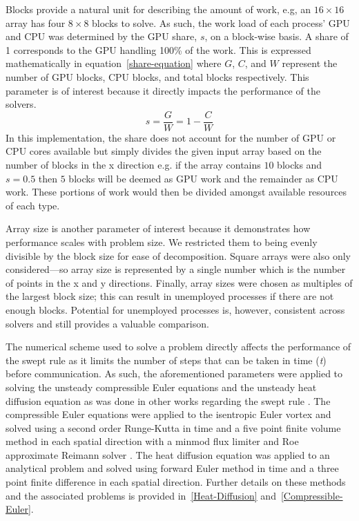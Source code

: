 \documentclass[preprints,article,accept,moreauthors,pdftex]{Definitions/mdpi}
\begin{document}
\par
Blocks provide a natural unit for describing the amount of work, e.g, an $16\times16$ array has four $8\times8$ blocks to solve. As such, the work load of each process' GPU and CPU was determined by the GPU share, $s$, on a block-wise basis. A share of 1 corresponds to the GPU handling 100\% of the work. This is expressed mathematically in equation~\ref{share-equation} where $G$, $C$, and $W$ represent the number of GPU blocks, CPU blocks, and total blocks respectively. This parameter is of interest because it directly impacts the performance of the solvers.
\begin{equation}
    \label{share-equation}
    s = \frac{G}{W} = 1-\frac{C}{W}
\end{equation}
In this implementation, the share does not account for the number of GPU or CPU cores available but simply divides the given input array based on the number of blocks in the x direction e.g. if the array contains $10$ blocks and $s=0.5$ then $5$ blocks will be deemed as GPU work and the remainder as CPU work. These portions of work would then be divided amongst available resources of each type. 

\par
Array size is another parameter of interest because it demonstrates how performance scales with problem size. We restricted them to being evenly divisible by the block size for ease of decomposition. Square arrays were also only considered---so array size is represented by a single number which is the number of points in the x and y directions. Finally, array sizes were chosen as multiples of the largest block size; this can result in unemployed processes if there are not enough blocks. Potential for unemployed processes is, however, consistent across solvers and still provides a valuable comparison.

\par
The numerical scheme used to solve a problem directly affects the performance of the swept rule as it limits the number of steps that can be taken in time (\textit{t}) before communication. As such, the aforementioned parameters were applied to solving the unsteady compressible Euler equations and the unsteady heat diffusion equation as was done in other works regarding the swept rule \cite{Alhubail2016ThePDEs,Alhubail2018ThePDEs,Magee2018AcceleratingDecomposition, Magee2020ApplyingSystems}. The compressible Euler equations were applied to the isentropic Euler vortex and solved using a second order Runge-Kutta in time and a five point finite volume method in each spatial direction with a minmod flux limiter and Roe approximate Reimann solver \cite{SpiegelAMethods,Leveque2002FiniteProblems}. The heat diffusion equation was applied to an analytical problem and solved using forward Euler method in time and a three point finite difference in each spatial direction. Further details on these methods and the associated problems is provided in~\ref{Heat-Diffusion} and~\ref{Compressible-Euler}.
\end{document}
